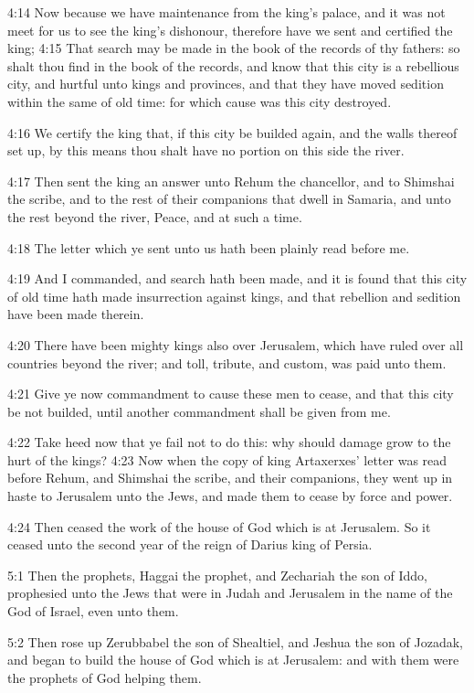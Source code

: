 4:14 Now because we have maintenance from the king's palace, and it
was not meet for us to see the king's dishonour, therefore have we
sent and certified the king; 4:15 That search may be made in the book
of the records of thy fathers: so shalt thou find in the book of the
records, and know that this city is a rebellious city, and hurtful
unto kings and provinces, and that they have moved sedition within the
same of old time: for which cause was this city destroyed.

4:16 We certify the king that, if this city be builded again, and the
walls thereof set up, by this means thou shalt have no portion on this
side the river.

4:17 Then sent the king an answer unto Rehum the chancellor, and to
Shimshai the scribe, and to the rest of their companions that dwell in
Samaria, and unto the rest beyond the river, Peace, and at such a
time.

4:18 The letter which ye sent unto us hath been plainly read before
me.

4:19 And I commanded, and search hath been made, and it is found that
this city of old time hath made insurrection against kings, and that
rebellion and sedition have been made therein.

4:20 There have been mighty kings also over Jerusalem, which have
ruled over all countries beyond the river; and toll, tribute, and
custom, was paid unto them.

4:21 Give ye now commandment to cause these men to cease, and that
this city be not builded, until another commandment shall be given
from me.

4:22 Take heed now that ye fail not to do this: why should damage grow
to the hurt of the kings?  4:23 Now when the copy of king Artaxerxes'
letter was read before Rehum, and Shimshai the scribe, and their
companions, they went up in haste to Jerusalem unto the Jews, and made
them to cease by force and power.

4:24 Then ceased the work of the house of God which is at Jerusalem.
So it ceased unto the second year of the reign of Darius king of
Persia.

5:1 Then the prophets, Haggai the prophet, and Zechariah the son of
Iddo, prophesied unto the Jews that were in Judah and Jerusalem in the
name of the God of Israel, even unto them.

5:2 Then rose up Zerubbabel the son of Shealtiel, and Jeshua the son
of Jozadak, and began to build the house of God which is at Jerusalem:
and with them were the prophets of God helping them.

